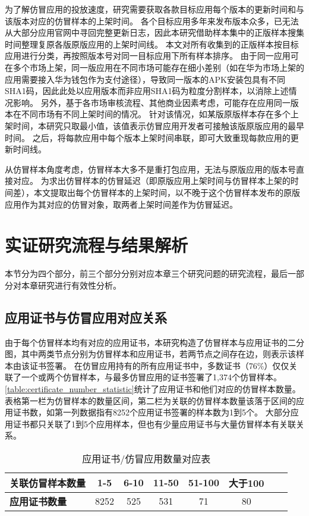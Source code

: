 为了解仿冒应用的投放速度，研究需要获取各款目标应用每个版本的更新时间和与该版本对应的仿冒样本的上架时间。
各个目标应用多年来发布版本众多，已无法从大部分应用官网中寻回完整更新日志，因此本研究借助样本集中的正版样本搜集时间整理复原各版原版应用的上架时间线。
本文对所有收集到的正版样本按目标应用进行分类，再按照版本号对同一目标应用下所有样本排序。
由于同一应用可在多个市场上架，同一版应用在不同市场可能存在细小差别（如在华为市场上架的应用需要接入华为钱包作为支付途径），导致同一版本的APK安装包具有不同SHA1码，因此此处以应用版本而非应用SHA1码为粒度分割样本，以消除上述情况影响。
另外，基于各市场审核流程、其他商业因素考虑，可能存在应用同一版本在不同市场有不同上架时间的情况。
针对该情况，如某版原版样本存在多个上架时间，本研究只取最小值，该值表示仿冒应用开发者可接触该版原版应用的最早时间。
之后，将每款应用中每个版本上架时间串联，即可大致重现每款应用的更新时间线。


从仿冒样本角度考虑，仿冒样本大多不是重打包应用，无法与原版应用的版本号直接对应。
为求出仿冒样本的仿冒延迟（即原版应用上架时间与仿冒样本上架的时间差），本文提取出每个仿冒样本的上架时间，以不晚于这个仿冒样本发布的原版应用作为其对应的仿冒对象，取两者上架时间差作为仿冒延迟。

\section{实证研究流程与结果解析}

本节分为四个部分，前三个部分分别对应本章三个研究问题的研究流程，最后一部分对本章研究进行有效性分析。

\subsection{应用证书与仿冒应用对应关系}


由于每个仿冒样本均有对应的应用证书，本研究构造了仿冒样本与应用证书的二分图，其中两类节点分别为仿冒样本和应用证书，若两节点之间存在边，则表示该样本由该证书签署。
在仿冒应用持有的所有应用证书中，多数证书（76\%）仅仅关联了一个或两个仿冒样本，与最多仿冒应用的证书签署了1,374个仿冒样本。
\autoref{table:certificate_number_statistic}统计了应用证书和他们对应的仿冒样本数量。
表格第一栏为仿冒样本的数量区间，第二栏为关联的仿冒样本数量该落于区间的应用证书数，如第一列数据指有8252个应用证书签署的样本数为1到5个。
大部分应用证书都只关联了1到5个应用样本，但也有少量应用证书与大量仿冒样本有关联关系。

\begin{table}[htbp]
    \renewcommand{\arraystretch}{1}
    \footnotesize
    \centering
    \caption{应用证书/仿冒应用数量对应表}
    \vspace{1mm}
    \begin{tabular}{l c c c c c c c}
        \toprule
        {\bf 关联仿冒样本数量} & {\bf 1-5} & {\bf 6-10} & {\bf 11-50} & {\bf 51-100} & {\bf 大于100} \\
        \midrule
        {\bf 应用证书数量}     & 8252      & 525        & 531         & 71           & 80            \\
        \bottomrule
    \end{tabular}
    \label{table:certificate_number_statistic}
\end{table}

